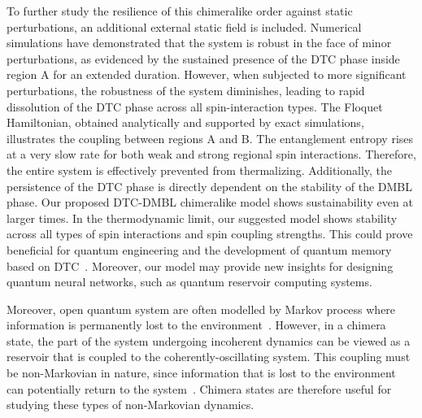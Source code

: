 \documentclass[12pt]{iopart}
\begin{document}
To further study the resilience of this chimeralike order against static perturbations, an additional external static field is included. Numerical simulations have demonstrated that the system is robust in the face of minor perturbations, as evidenced by the sustained presence of the DTC phase inside region A for an extended duration. However, when subjected to more significant perturbations, the robustness of the system diminishes, leading to rapid dissolution of the DTC phase across all spin-interaction types. The Floquet Hamiltonian, obtained analytically and supported by exact simulations, illustrates the coupling between regions A and B. The entanglement entropy rises at a very slow rate for both weak and strong regional spin interactions. Therefore, the entire system is effectively prevented from thermalizing. Additionally, the persistence of the DTC phase is directly dependent on the stability of the DMBL phase. Our proposed DTC-DMBL chimeralike model shows sustainability even at larger times. In the thermodynamic limit, our suggested model shows stability across all types of spin interactions and spin coupling strengths. This could prove beneficial for quantum engineering and the development of quantum memory based on DTC~\cite{zhang_observation_2017}. Moreover, our model may provide new insights for designing quantum neural networks, such as quantum reservoir computing systems\cite{Fujii_2017, Martinez_2021,Mujal_2021, Akitada2022}.

Moreover, open quantum system are often modelled by Markov process where information is permanently lost to the environment~\cite{Agarwal2012, Gorini1976}. However, in a chimera state, the part of the system undergoing incoherent dynamics can be viewed as a reservoir that is coupled to the coherently-oscillating system.
This coupling must be non-Markovian in nature, since information that is lost to the environment can potentially return to the system~\cite{Accardi1976,Lindblad1976}. Chimera states are therefore useful for studying these types of non-Markovian dynamics.
\end{document}
